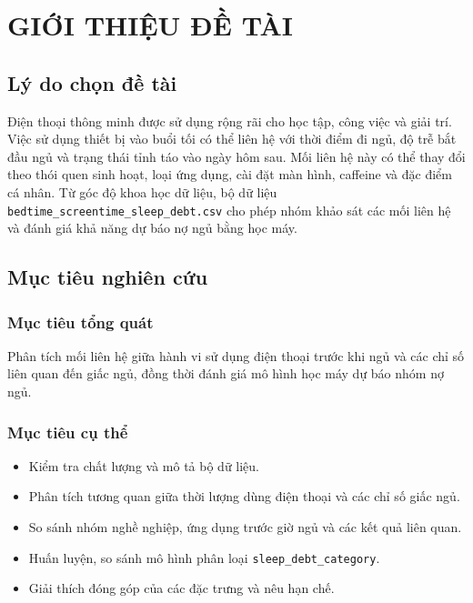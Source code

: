 \chapter{GIỚI THIỆU ĐỀ TÀI}
\section{Lý do chọn đề tài}
Điện thoại thông minh được sử dụng rộng rãi cho học tập, công việc và giải trí. Việc sử dụng thiết bị vào buổi tối có thể liên hệ với thời điểm đi ngủ, độ trễ bắt đầu ngủ và trạng thái tỉnh táo vào ngày hôm sau. Mối liên hệ này có thể thay đổi theo thói quen sinh hoạt, loại ứng dụng, cài đặt màn hình, caffeine và đặc điểm cá nhân. Từ góc độ khoa học dữ liệu, bộ dữ liệu \texttt{bedtime\_screentime\_sleep\_debt.csv} cho phép nhóm khảo sát các mối liên hệ và đánh giá khả năng dự báo nợ ngủ bằng học máy.
\section{Mục tiêu nghiên cứu}
\subsection{Mục tiêu tổng quát}
Phân tích mối liên hệ giữa hành vi sử dụng điện thoại trước khi ngủ và các chỉ số liên quan đến giấc ngủ, đồng thời đánh giá mô hình học máy dự báo nhóm nợ ngủ.
\subsection{Mục tiêu cụ thể}
\begin{itemize}[leftmargin=1.2cm]
\item Kiểm tra chất lượng và mô tả bộ dữ liệu.
\item Phân tích tương quan giữa thời lượng dùng điện thoại và các chỉ số giấc ngủ.
\item So sánh nhóm nghề nghiệp, ứng dụng trước giờ ngủ và các kết quả liên quan.
\item Huấn luyện, so sánh mô hình phân loại \texttt{sleep\_debt\_category}.
\item Giải thích đóng góp của các đặc trưng và nêu hạn chế.
\end{itemize}
